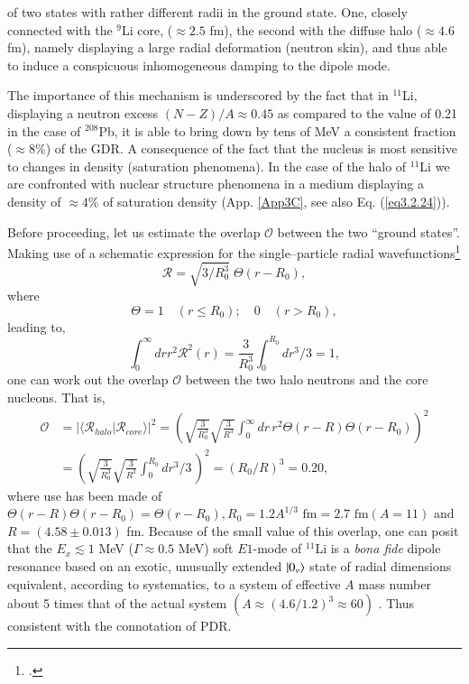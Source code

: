 of two states with rather different radii in the ground state. One, closely connected with the $^{9}$Li core, ($\approx 2.5$ fm), the second with the diffuse halo ($\approx 4.6$ fm), namely displaying a large radial deformation (neutron skin), and thus able to induce a conspicuous inhomogeneous damping to the dipole mode. 


The importance of this mechanism is underscored by the fact that in $^{11}$Li, displaying a neutron excess $(N-Z)/A\approx0.45$ as compared to the value of 0.21 in the case of $^{208}$Pb, it is able to bring down by tens of MeV a consistent fraction ($\approx 8$\%) of the GDR. A consequence of the fact that the nucleus is most sensitive to changes in density (saturation phenomena). In the case of the halo of $^{11}$Li we are confronted with nuclear structure phenomena in a medium displaying a density of $\approx 4$\% of saturation density (App. \ref{App3C}, see also Eq. (\ref{eq3.2.24})). 

Before proceeding, let us estimate the overlap $\mathcal{O}$ between the two ``ground states''. Making use of a schematic expression for the single--particle radial wavefunctions\footnote{\cite{Bohr:69}.}
\begin{equation}
\mathcal{R}=\sqrt{3/R_0^3}\;\Theta(r-R_0),
\end{equation}
where 
\begin{equation*}
\Theta=1 \quad (r\leq R_0);\quad 0 \quad (r>R_0),
\end{equation*}
leading to,
\begin{equation}
\int_0^{\infty}dr r^2 \mathcal{R}^2(r)=\frac{3}{R_0^3}\int_0^{R_0}dr^3/3=1,
\end{equation}
one can work out the overlap $\mathcal{O}$ between the two halo neutrons and the core nucleons. That is, 
\begin{equation}\label{eq2.6.4}
\begin{split}
\mathcal{O}&=|\langle\mathcal{R}_{halo}|\mathcal{R}_{core}\rangle|^2=\left(\sqrt{\frac{3}{R_0^3}}\sqrt{\frac{3}{R^3}}\int_0^{\infty}dr\,r^2\Theta(r-R)\Theta(r-R_0)\right)^2\\
&=\left(\sqrt{\frac{3}{R_0^3}}\sqrt{\frac{3}{R^3}}\int_0^{R_0}dr^3/3\,\right)^2=(R_0/R)^3=0.20,
\end{split}
\end{equation}
where use has been made of $\Theta(r-R)\Theta(r-R_0)=\Theta(r-R_0), R_0=1.2A^{1/3} \text{ fm}=2.7 \text{ fm} (A=11)$ and $R=(4.58\pm 0.013)$ fm.
Because of the small value of this overlap, one can posit that the $E_x\lesssim1$ MeV ($\Gamma \approx 0.5$ MeV) soft $E1$-mode of $^{11}$Li is a \textit{bona fide} dipole  resonance based on an exotic, unusually extended $|{0_\nu} \rangle$ state of radial dimensions equivalent, according to systematics, to  a system of effective $A$ mass number about 5 times that of the actual system $(A\approx (4.6/1.2)^3\approx 60)$ .
 Thus consistent with the connotation of PDR.

